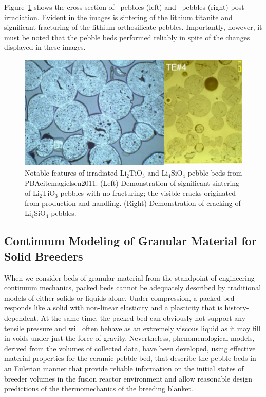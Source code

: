 Figure~\ref{fig:pba} shows the cross-section of \lit~pebbles (left) and \lis~pebbles (right) post irradiation. Evident in the images is sintering of the lithium titanite and significant fracturing of the lithium orthosilicate pebbles. Importantly, however, it must be noted that the pebble beds performed reliably in spite of the changes displayed in these images.\cite{Magielsen2007} 


\begin{figure}[t!]
\centering
\includegraphics[width=\singleimagewidth]{figures/Fig-10}
\caption{Notable features of irradiated Li$_2$TiO$_3$ and Li$_4$SiO$_4$ pebble beds from PBAcite{magielsen2011}. (Left) Demonstration of significant sintering of Li$_2$TiO$_3$ pebbles with no fracturing; the visible cracks originated from production and handling. (Right) Demonstration of cracking of Li$_4$SiO$_4$ pebbles.}
\label{fig:pba}
\end{figure}



\subsection{Continuum Modeling of Granular Material for Solid Breeders}
When we consider beds of granular material from the standpoint of engineering continuum mechanics, packed beds cannot be adequately described by traditional models of either solids or liquids alone. Under compression, a packed bed responds like a solid with non-linear elasticity and a plasticity that is history-dependent. At the same time, the packed bed can obviously not support any tensile pressure and will often behave as an extremely viscous liquid as it may fill in voids under just the force of gravity. Nevertheless, phenomenological models, derived from the volumes of collected data, have been developed, using effective material properties for the ceramic pebble bed, that describe the pebble beds in an Eulerian manner that provide reliable information on the initial states of breeder volumes in the fusion reactor environment and allow reasonable design predictions of the thermomechanics of the breeding blanket. 


